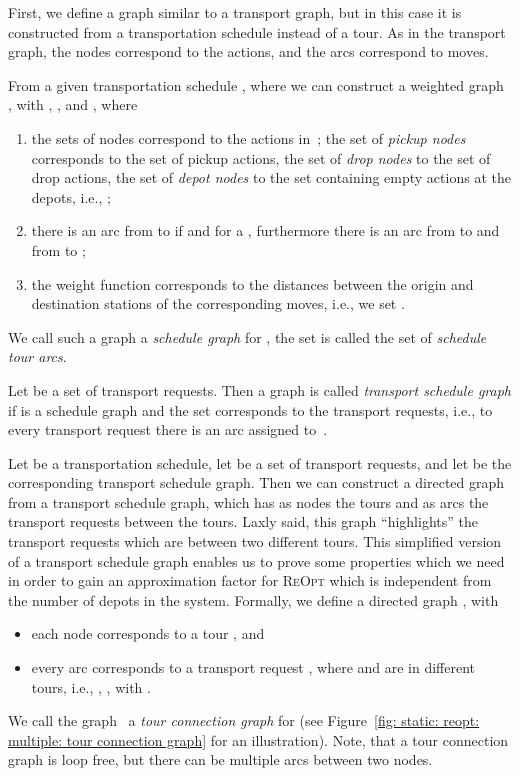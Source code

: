 \documentclass[english]{llncs}
\numberwithin{sublemma}{lemma}
\newcommand{\REOPT}{\textsc{ReOpt}\xspace}
\begin{document}
First, we define a graph similar to a transport graph, but in this case it is constructed from a transportation schedule instead of a tour.
As in the transport graph, the nodes correspond to the actions, and the arcs correspond to moves.


\begin{definition}\label{def: static: reopt: multiple: transport graph}
From a given transportation schedule , 
where 
we can construct a weighted graph ,
with , ,  and ,
where
\begin{enumerate}
 \item the sets of nodes  correspond to the actions in~; the set of \emph{pickup nodes}  corresponds to the set of pickup actions,
        the set of \emph{drop nodes}  to the set of drop actions,
        the set of \emph{depot nodes}  to the set containing empty actions at the depots, i.e., ;
 \item there is an arc from  to  if  and  for a , furthermore there is an arc from  to  and from  to ;
 \item the weight function  corresponds to the distances between the origin and destination stations of the corresponding moves, i.e., we set .
\end{enumerate}
We call such a graph a \emph{schedule graph} for , the set  is called the set of \emph{schedule tour arcs}.

Let  be a set of transport requests.
Then a graph  is called \emph{transport schedule graph}
if  is a schedule graph and the set  corresponds to the transport requests,
i.e., to every transport request  there is an arc  assigned to~.
\end{definition}



Let  be a transportation schedule, let  be a set of transport requests, and let  be the corresponding transport schedule graph.
Then we can construct a directed graph from a transport schedule graph, which has as nodes the tours and as arcs the transport requests between the tours.
Laxly said, this graph ``highlights'' the transport requests which are between two different tours.
This simplified version of a transport schedule graph enables us to prove some properties which we need in order to gain an approximation factor for \REOPT which is independent from the number of depots in the system.
Formally, we define a directed graph , with
\begin{itemize}
 \item each node  corresponds to a tour , and
 \item every arc corresponds to a transport request , where  and  are in different tours, i.e., , , with .
\end{itemize}
We call the graph~ a \emph{tour connection graph} for  (see Figure~\ref{fig: static: reopt: multiple: tour connection graph} for an illustration).
Note, that a tour connection graph is loop free, but there can be multiple arcs between two nodes.
\end{document}
